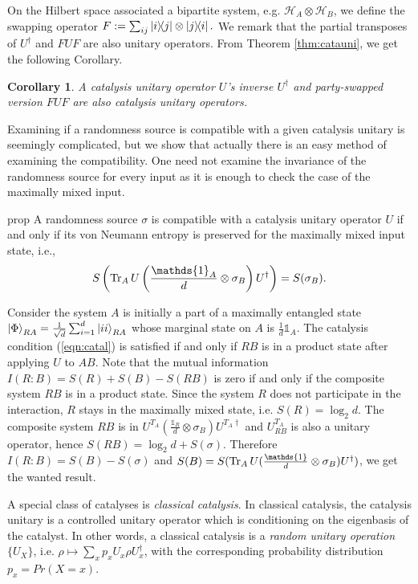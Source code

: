 \documentclass[aps, reprint, amsmath,amssymb, prx, superscriptaddress]{revtex4-2}
\newtheorem{corollary}[theorem]{Corollary}
\begin{document}
On the Hilbert space associated a bipartite system, e.g. $\mathcal{H}_A\otimes \mathcal{H}_B$, we define the swapping operator $F:=\sum_{ij} \dyad{i}{j} \otimes \dyad{j}{i}.$ We remark that the partial transposes of $U^\dag$ and $FUF$ are also unitary operators. From Theorem \ref{thm:catauni}, we get the following Corollary.
\begin{corollary}
    A catalysis unitary operator $U$'s inverse $U^\dag$ and party-swapped version $FUF$ are also catalysis unitary operators.
\end{corollary}

Examining if a randomness source is compatible with a given catalysis unitary is seemingly complicated, but we show that actually there is an easy method of examining the compatibility. One need not examine the invariance of the randomness source for every input as it is enough to check the case of the maximally mixed input.

\begin{theoremEnd}{prop}
    A randomness source $\sigma$ is compatible with a catalysis unitary operator $U$ if and only if its von Neumann entropy is preserved for the maximally mixed input state, i.e.,
    \begin{equation}
        S\left(\Tr_A U\left(\frac{\mathds{1}_A}{d}\otimes\sigma_B\right)U^\dag\right)=S(\sigma_B).
    \end{equation}
\end{theoremEnd}
\begin{proofEnd}
    Consider the system $A$ is initially a part of a maximally entangled state $\ket{\Phi}_{RA}=\frac{1}{\sqrt{d}}\sum_{i=1}^d \ket{ii}_{RA}$ whose marginal state on $A$ is $\frac{1}{d}\mathds{1}_A$. The catalysis condition (\ref{eqn:catal}) is satisfied if and only if $RB$ is in a product state after applying $U$ to $AB$. Note that the mutual information $I(R:B)=S(R)+S(B)-S(RB)$ is zero if and only if the composite system $RB$ is in a product state. Since the system $R$ does not participate in the interaction, $R$ stays in the maximally mixed state, i.e. $S(R)=\log_2  d$. The composite system $RB$ is in $U^{T_A}(\frac{\mathds{1}_R}{d}\otimes\sigma_B)U^{T_A\dag}$ and $U_{RB}^{T_A}$ is also a unitary operator, hence $S(RB)=\log_2  d + S(\sigma)$. Therefore $I(R:B)=S(B)-S(\sigma)$ and $S(B)= S(\Tr_A U(\frac{\mathds{1}}{d}\otimes\sigma_B)U^\dag)$, we get the wanted result.
\end{proofEnd}

A special class of catalyses is \textit{classical catalysis}. In classical catalysis, the catalysis unitary is a controlled unitary operator which is conditioning on the eigenbasis of the catalyst. In other words, a classical catalysis is a \textit{random unitary operation} $\{U_X\}$, i.e. $\rho \mapsto \sum_x p_x U_x \rho U_x^\dag$, with the corresponding probability distribution $p_x=Pr(X=x)$.
\end{document}
